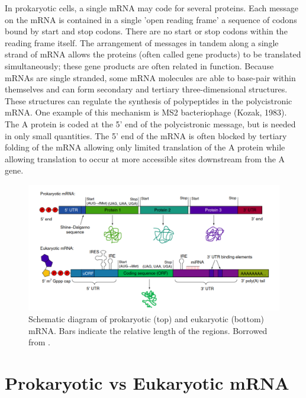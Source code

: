 In prokaryotic cells, a single mRNA may code for several proteins. Each message on the mRNA is contained in a single 'open reading frame' 
a sequence of codons bound by start and stop codons. There are no start or stop codons within the reading frame itself. 
The arrangement of messages in tandem along a single strand of mRNA allows the proteins (often called gene products) to 
be translated simultaneously; these gene products are often related in function. Because mRNAs are single stranded, some 
mRNA molecules are able to base-pair within themselves and can form secondary and tertiary three-dimensional structures. 
These structures can regulate the synthesis of polypeptides in the polycistronic mRNA. One example of this mechanism is 
MS2 bacteriophage (Kozak, 1983). The A protein is coded at the 5' end of the polycistronic message, but is needed in only 
small quantities. The 5' end of the mRNA is often blocked by tertiary folding of the mRNA allowing only limited translation 
of the A protein while allowing translation to occur at more accessible sites downstream from the A gene.

\begin{figure}[!ht]
    \centering
    \includegraphics[width=1\linewidth]{./figure/mrna_comparison.png}
    \caption{Schematic diagram of prokaryotic (top) and eukaryotic (bottom) mRNA. Bars indicate the relative length of the regions. 
    Borrowed from  \cite{Goss2016}.}
    \label{fig:mrna_comparison}
\end{figure}

\section{Prokaryotic vs Eukaryotic mRNA}
